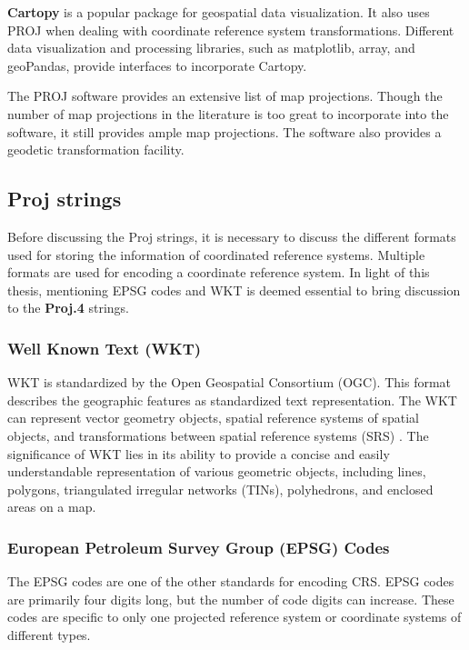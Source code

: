 \textbf{Cartopy} \cite{Cartopy} is a popular package for geospatial data visualization. It also uses PROJ when dealing with coordinate reference system transformations. Different data visualization and processing libraries, such as matplotlib, array, and geoPandas, provide interfaces to incorporate Cartopy.

The PROJ software provides an extensive list of map projections. Though the number of map projections in the literature is too great to incorporate into the software, it still provides ample map projections. The software also provides a geodetic transformation facility.

\subsection{Proj strings}
Before discussing the Proj strings, it is necessary to discuss the different formats used for storing the information of coordinated reference systems. Multiple formats are used for encoding a coordinate reference system. In light of this thesis, mentioning EPSG codes and WKT is deemed essential to bring discussion to the \textbf{Proj.4} strings.

\subsubsection{Well Known Text (WKT)}
WKT is standardized by the Open Geospatial Consortium (OGC)\cite{locWellknownText}. This format describes the geographic features as standardized text representation.
The WKT can represent vector geometry objects, spatial reference systems of spatial objects, and transformations between spatial reference systems (SRS) \cite{locWellknownText}.
The significance of WKT lies in its ability to provide a concise and easily understandable representation of various geometric objects, including lines, polygons, triangulated irregular networks (TINs), polyhedrons, and enclosed areas on a map\cite{locWellknownText}.

\subsubsection{European Petroleum Survey Group (EPSG) Codes}
The EPSG codes are one of the other standards for encoding CRS. EPSG codes are primarily four digits long, but the number of code digits can increase. These codes are specific to only one projected reference system or coordinate systems of different types.

